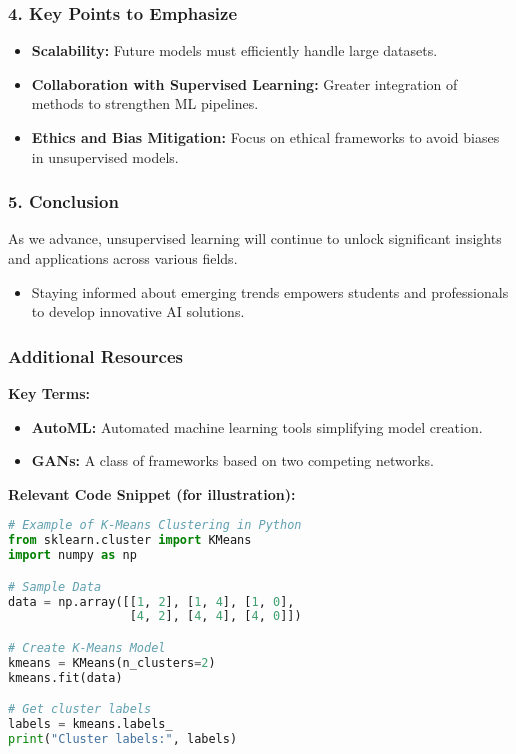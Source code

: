 \documentclass[aspectratio=169]{beamer}
\begin{document}
\begin{frame}
    \frametitle{4. Key Points to Emphasize}
    \begin{itemize}
        \item \textbf{Scalability:} Future models must efficiently handle large datasets.
        \item \textbf{Collaboration with Supervised Learning:} Greater integration of methods to strengthen ML pipelines.
        \item \textbf{Ethics and Bias Mitigation:} Focus on ethical frameworks to avoid biases in unsupervised models.
    \end{itemize}
\end{frame}

\begin{frame}
    \frametitle{5. Conclusion}
    As we advance, unsupervised learning will continue to unlock significant insights and applications across various fields.
    \begin{itemize}
        \item Staying informed about emerging trends empowers students and professionals to develop innovative AI solutions.
    \end{itemize}
\end{frame}

\begin{frame}[fragile]
    \frametitle{Additional Resources}
    \textbf{Key Terms:}
    \begin{itemize}
        \item \textbf{AutoML:} Automated machine learning tools simplifying model creation.
        \item \textbf{GANs:} A class of frameworks based on two competing networks.
    \end{itemize}

    \textbf{Relevant Code Snippet (for illustration):}
    \begin{lstlisting}[language=Python]
# Example of K-Means Clustering in Python
from sklearn.cluster import KMeans
import numpy as np

# Sample Data
data = np.array([[1, 2], [1, 4], [1, 0],
                 [4, 2], [4, 4], [4, 0]])

# Create K-Means Model
kmeans = KMeans(n_clusters=2)
kmeans.fit(data)

# Get cluster labels
labels = kmeans.labels_
print("Cluster labels:", labels)
    \end{lstlisting}
\end{frame}
\end{document}
